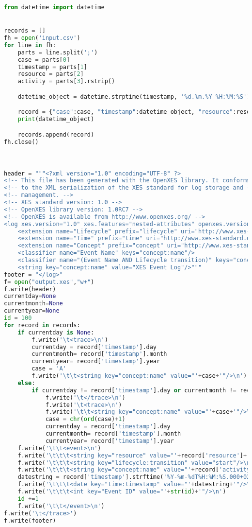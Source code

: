 \begin{lstlisting}[language=Python, caption=Parser: von CSV nach XES]
from datetime import datetime


records = []
fh = open('input.csv')
for line in fh:
    parts = line.split(';')
    case = parts[0]
    timestamp = parts[1]
    resource = parts[2]
    activity = parts[3].rstrip()

    datetime_object = datetime.strptime(timestamp, '%d.%m.%Y %H:%M:%S')

    record = {"case":case, "timestamp":datetime_object, "resource":resource, "activity":activity}
    print(datetime_object)

    records.append(record)
fh.close()



header = """<?xml version="1.0" encoding="UTF-8" ?>
<!-- This file has been generated with the OpenXES library. It conforms -->
<!-- to the XML serialization of the XES standard for log storage and -->
<!-- management. -->
<!-- XES standard version: 1.0 -->
<!-- OpenXES library version: 1.0RC7 -->
<!-- OpenXES is available from http://www.openxes.org/ -->
<log xes.version="1.0" xes.features="nested-attributes" openxes.version="1.0RC7">
	<extension name="Lifecycle" prefix="lifecycle" uri="http://www.xes-standard.org/lifecycle.xesext"/>
	<extension name="Time" prefix="time" uri="http://www.xes-standard.org/time.xesext"/>
	<extension name="Concept" prefix="concept" uri="http://www.xes-standard.org/concept.xesext"/>
	<classifier name="Event Name" keys="concept:name"/>
	<classifier name="(Event Name AND Lifecycle transition)" keys="concept:name lifecycle:transition"/>
	<string key="concept:name" value="XES Event Log"/>"""
footer = "</log>"
f= open("output.xes","w+")
f.write(header)
currentday=None
currentmonth=None
currentyear=None
id = 100
for record in records:
    if currentday is None:
        f.write('\t<trace>\n')
        currentday = record['timestamp'].day
        currentmonth= record['timestamp'].month
        currentyear= record['timestamp'].year
        case = 'A'
        f.write('\t\t<string key="concept:name" value="'+case+'"/>\n')
    else:
        if currentday != record['timestamp'].day or currentmonth != record['timestamp'].month or currentyear != record['timestamp'].year:
            f.write('\t</trace>\n')
            f.write('\t<trace>\n')
            f.write('\t\t<string key="concept:name" value="'+case+'"/>\n')
            case = chr(ord(case)+1)
            currentday = record['timestamp'].day
            currentmonth= record['timestamp'].month
            currentyear= record['timestamp'].year
    f.write('\t\t<event>\n')
    f.write('\t\t\t<string key="resource" value="'+record['resource']+'"/>\n')
    f.write('\t\t\t<string key="lifecycle:transition" value="start"/>\n')
    f.write('\t\t\t<string key="concept:name" value="'+record['activity']+'"/>\n')
    datestring = record['timestamp'].strftime('%Y-%m-%dT%H:%M:%S.000+02:00')
    f.write('\t\t\t<date key="time:timestamp" value="'+datestring+'"/>\n')
    f.write('\t\t\t<int key="Event ID" value="'+str(id)+'"/>\n')
    id +=1
    f.write('\t\t</event>\n')
f.write('\t</trace>')    
f.write(footer)
\end{lstlisting}

